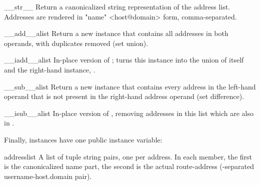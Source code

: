 \begin{methoddesc}{__str__}{}
Return a canonicalized string representation of the address list.
Addresses are rendered in "name" <host@domain> form, comma-separated.
\end{methoddesc}

\begin{methoddesc}{__add__}{alist}
Return a new  instance that contains all addresses
in both  operands, with duplicates removed (set
union).
\end{methoddesc}

\begin{methoddesc}{__iadd__}{alist}
In-place version of ; turns this 
instance into the union of itself and the right-hand instance,
.
\end{methoddesc}

\begin{methoddesc}{__sub__}{alist}
Return a new  instance that contains every address
in the left-hand  operand that is not present in
the right-hand address operand (set difference).
\end{methoddesc}

\begin{methoddesc}{__isub__}{alist}
In-place version of , removing addresses in this
list which are also in .
\end{methoddesc}


Finally,  instances have one public instance variable:

\begin{memberdesc}{addresslist}
A list of tuple string pairs, one per address.  In each member, the
first is the canonicalized name part, the second is the
actual route-address (-separated username-host.domain
pair).
\end{memberdesc}
